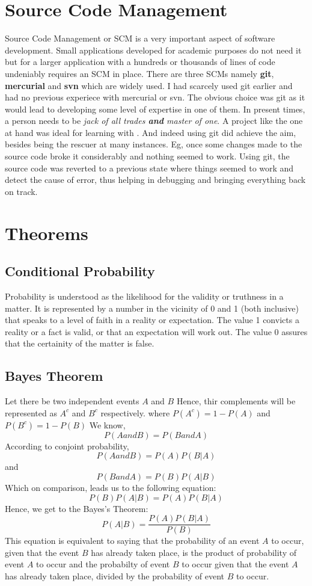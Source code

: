 \section{Source Code Management}
\label{sec:git}
Source Code Management or SCM is a very important aspect of software development. Small applications developed for academic purposes do not need it but for a larger application with a hundreds or thousands of lines of code undeniably requires an SCM in place. There are three SCMs namely \textbf{git}, \textbf{mercurial} and \textbf{svn} which are widely used. I had scarcely used git earlier and had no previous experiece with mercurial or svn. The obvious choice was git as it would lead to developing some level of expertise in one of them. In present times, a person needs to be \emph{jack of all trades \textbf{and} master of one}. A project like the one at hand was ideal for learning with . And indeed using git did achieve the aim, besides being the rescuer at many instances. Eg, once some changes made to the source code broke it considerably and nothing seemed to work. Using git, the source code was reverted to a previous state where things seemed to work and detect the cause of error, thus helping in debugging and bringing everything back on track.

\section{Theorems}

\subsection{Conditional Probability}
Probability is understood as the likelihood for the validity or truthness in a matter. It is represented by a number in the vicinity of 0 and 1 (both inclusive) that speaks to a level of faith in a reality or expectation. The value 1 convicts a reality or a fact is valid, or that an expectation will work out. The value 0 assures that the certainity of the matter is false.

\subsection{Bayes Theorem}
Let there be two independent events $A$ and $B$
Hence, thir complements will be represented as $A^c$ and $B^c$ respectively.
where $P(A^c) = 1 - P(A)$ and $P(B^c) = 1 - P(B)$
We know,
$$P(A and B) = P(B and A)$$
According to conjoint probability,
$$P(A and B) = P(A)P(B|A)$$
and
$$P(B and A) = P(B)P(A|B)$$
Which on comparison, leads us to the following equation:
$$P(B)P(A|B) = P(A)P(B|A)$$
Hence, we get to the Bayes's Theorem:
\begin{equation} \label{eq1}
P(A|B) = \frac{P(A)P(B|A)}{P(B)}
\end{equation}
This equation is equivalent to saying that the probability of an event $A$ to occur, given that the event $B$ has already taken place, is the product of probability of event $A$ to occur and the probabilty of event $B$ to occur given that the event $A$ has already taken place, divided by the probability of event $B$ to occur.

